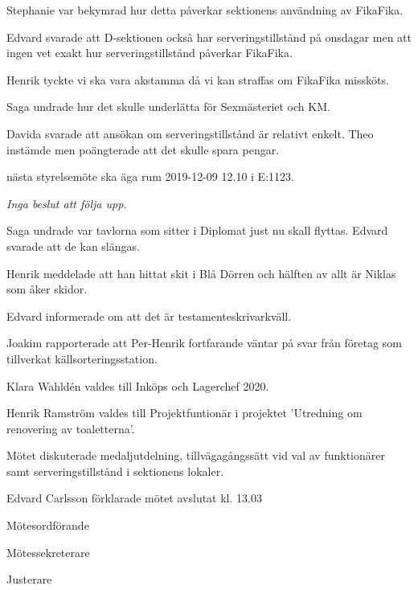 \documentclass[10pt]{article}
\def\mo{Edvard Carlsson}
\def\ms{Mattias Lundström}
\def\ji{Theo Nyman}
\begin{document}
\begin{paragrafer}
Stephanie var bekymrad hur detta påverkar sektionens användning av FikaFika.

Edvard svarade att D-sektionen också har serveringstillstånd på onsdagar men att ingen vet exakt hur serveringstillstånd påverkar FikaFika. 

Henrik tyckte vi ska vara akstamma då vi kan straffas om FikaFika missköts. 

Saga undrade hur det skulle underlätta för Sexmästeriet och KM. 

Davida svarade att ansökan om serveringstillstånd är relativt enkelt. Theo instämde men poängterade att det skulle spara pengar. 




\Mba nästa styrelsemöte ska äga rum 2019-12-09 12.10 i E:1123.

\textit{Inga beslut att följa upp.}

Saga undrade var tavlorna som sitter i Diplomat just nu skall flyttas. Edvard svarade att de kan slängas. 

Henrik meddelade att han hittat skit i Blå Dörren och hälften av allt är Niklas som åker skidor. 

Edvard informerade om att det är testamenteskrivarkväll.

Joakim rapporterade att Per-Henrik fortfarande väntar på svar från företag som tillverkat källsorteringsstation. 

Klara Wahldén valdes till Inköps och Lagerchef 2020. 

Henrik Ramström valdes till Projektfuntionär i projektet 'Utredning om renovering av toaletterna'.

Mötet diskuterade medaljutdelning, tillvägagångssätt vid val av funktionärer samt serveringstillstånd i sektionens lokaler. 


{\mo} förklarade mötet avslutat kl. 13.03
\end{paragrafer}

\hidesignfoot
\begin{signatures}{3}
\signature{\mo}{Mötesordförande}
\signature{\ms}{Mötessekreterare}
\signature{\ji}{Justerare}
\end{signatures}
\end{document}
